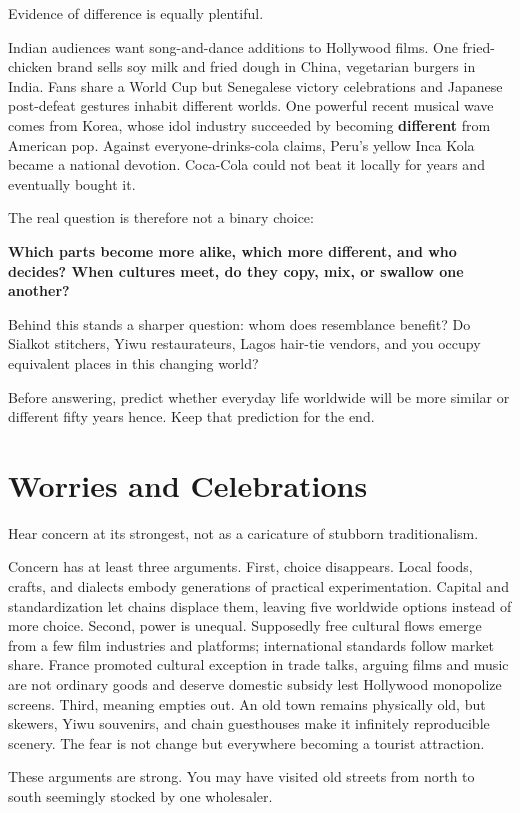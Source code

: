 Evidence of difference is equally plentiful.

Indian audiences want song-and-dance additions to Hollywood films. One fried-chicken brand sells soy milk and fried dough in China, vegetarian burgers in India. Fans share a World Cup but Senegalese victory celebrations and Japanese post-defeat gestures inhabit different worlds. One powerful recent musical wave comes from Korea, whose idol industry succeeded by becoming \textbf{different} from American pop. Against everyone-drinks-cola claims, Peru's yellow Inca Kola became a national devotion. Coca-Cola could not beat it locally for years and eventually bought it.

The real question is therefore not a binary choice:

\textbf{Which parts become more alike, which more different, and who decides? When cultures meet, do they copy, mix, or swallow one another?}

Behind this stands a sharper question: whom does resemblance benefit? Do Sialkot stitchers, Yiwu restaurateurs, Lagos hair-tie vendors, and you occupy equivalent places in this changing world?

Before answering, predict whether everyday life worldwide will be more similar or different fifty years hence. Keep that prediction for the end.

\section{Worries and Celebrations}
Hear concern at its strongest, not as a caricature of stubborn traditionalism.

Concern has at least three arguments. First, choice disappears. Local foods, crafts, and dialects embody generations of practical experimentation. Capital and standardization let chains displace them, leaving five worldwide options instead of more choice. Second, power is unequal. Supposedly free cultural flows emerge from a few film industries and platforms; international standards follow market share. France promoted cultural exception in trade talks, arguing films and music are not ordinary goods and deserve domestic subsidy lest Hollywood monopolize screens. Third, meaning empties out. An old town remains physically old, but skewers, Yiwu souvenirs, and chain guesthouses make it infinitely reproducible scenery. The fear is not change but everywhere becoming a tourist attraction.

These arguments are strong. You may have visited old streets from north to south seemingly stocked by one wholesaler.

